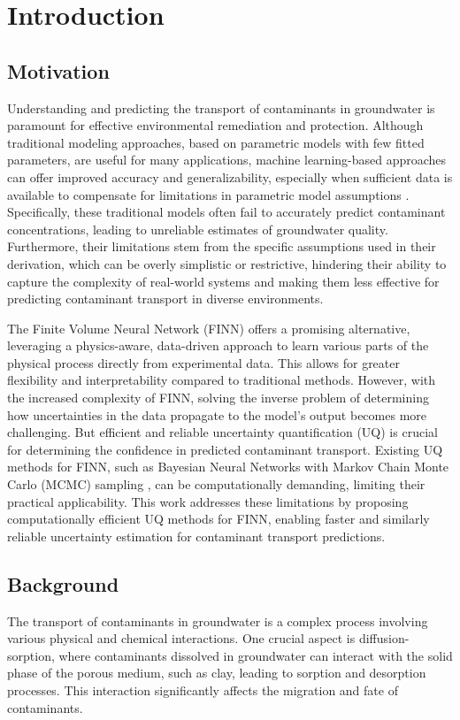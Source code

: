 \chapter{Introduction}

\section{Motivation}
Understanding and predicting the transport of contaminants in groundwater is paramount for effective environmental remediation and protection. Although traditional modeling approaches, based on parametric models with few fitted parameters, are useful for many applications, machine learning-based approaches can offer improved accuracy and generalizability, especially when sufficient data is available to compensate for limitations in parametric model assumptions \cite{finn}. Specifically, these traditional models often fail to accurately predict contaminant concentrations, leading to unreliable estimates of groundwater quality. Furthermore, their limitations stem from the specific assumptions used in their derivation, which can be overly simplistic or restrictive, hindering their ability to capture the complexity of real-world systems and making them less effective for predicting contaminant transport in diverse environments.

The Finite Volume Neural Network (FINN) \cite{finn} offers a promising alternative, leveraging a physics-aware, data-driven approach to learn various parts of the physical process directly from experimental data. This allows for greater flexibility and interpretability compared to traditional methods. However, with the increased complexity of FINN, solving the inverse problem of determining how uncertainties in the data propagate to the model's output becomes more challenging. But efficient and reliable uncertainty quantification (UQ) is crucial for determining the confidence in predicted contaminant transport. Existing UQ methods for FINN, such as Bayesian Neural Networks with Markov Chain Monte Carlo (MCMC) sampling \cite{bardenet2017markov}, can be computationally demanding, limiting their practical applicability. This work addresses these limitations by proposing computationally efficient UQ methods for FINN, enabling faster and similarly reliable uncertainty estimation for contaminant transport predictions.


\section{Background}
The transport of contaminants in groundwater is a complex process involving various physical and chemical interactions. One crucial aspect is diffusion-sorption, where contaminants dissolved in groundwater can interact with the solid phase of the porous medium, such as clay, leading to sorption and desorption processes. This interaction significantly affects the migration and fate of contaminants.

